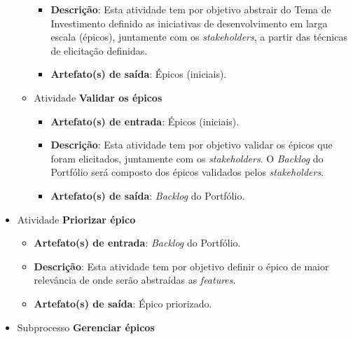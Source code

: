 \begin{itemize}
\begin{itemize}
\begin{itemize}
		\item \textbf{Descrição}: Esta atividade tem por objetivo abstrair do Tema de Investimento definido as
		  iniciativas de desenvolvimento em larga escala (épicos), juntamente com os \textit{stakeholders},
		  a partir das técnicas de elicitação definidas.
		
		\item \textbf{Artefato(s) de saída}: Épicos (iniciais).
		      
	      \end{itemize}
	      
	  \item Atividade \textbf{Validar os épicos}
	  
	      \begin{itemize}
		\item \textbf{Artefato(s) de entrada}: Épicos (iniciais).
		
		\item \textbf{Descrição}: Esta atividade tem por objetivo validar os épicos que foram elicitados, juntamente
		com os \textit{stakeholders}. O \textit{Backlog} do Portfólio será composto dos épicos validados pelos
		\textit{stakeholders}.
		
		\item \textbf{Artefato(s) de saída}: \textit{Backlog} do Portfólio.
		      
	      \end{itemize}
	\end{itemize} %
	      
      \item Atividade \textbf{Priorizar épico}
      
	  \begin{itemize}
	    \item \textbf{Artefato(s) de entrada}: \textit{Backlog}  do Portfólio.
	    
	    \item \textbf{Descrição}: Esta atividade tem por objetivo definir o épico de maior relevância de onde serão
	      abstraídas as \textit{features}.
	    
	    \item \textbf{Artefato(s) de saída}: Épico priorizado.
		  
	  \end{itemize}
	   
	
     \item Subprocesso \textbf{Gerenciar épicos}
     
	\begin{itemize}
	 

\end{itemize}
\end{itemize}

